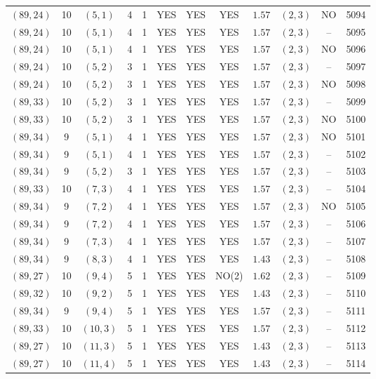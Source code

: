 \begin{longtable}{|c|c|c|c|c|c|c|c|c|c|c|c|}
$(89,24)$ & 10 & $(5,1)$ & 4 & 1 & YES & YES & YES & $1.57$ & $(2,3)$ & NO & 5094\\
$(89,24)$ & 10 & $(5,1)$ & 4 & 1 & YES & YES & YES & $1.57$ & $(2,3)$ & -- & 5095\\
$(89,24)$ & 10 & $(5,1)$ & 4 & 1 & YES & YES & YES & $1.57$ & $(2,3)$ & NO & 5096\\
$(89,24)$ & 10 & $(5,2)$ & 3 & 1 & YES & YES & YES & $1.57$ & $(2,3)$ & -- & 5097\\
$(89,24)$ & 10 & $(5,2)$ & 3 & 1 & YES & YES & YES & $1.57$ & $(2,3)$ & NO & 5098\\
$(89,33)$ & 10 & $(5,2)$ & 3 & 1 & YES & YES & YES & $1.57$ & $(2,3)$ & -- & 5099\\
$(89,33)$ & 10 & $(5,2)$ & 3 & 1 & YES & YES & YES & $1.57$ & $(2,3)$ & NO & 5100\\
$(89,34)$ & 9 & $(5,1)$ & 4 & 1 & YES & YES & YES & $1.57$ & $(2,3)$ & NO & 5101\\
$(89,34)$ & 9 & $(5,1)$ & 4 & 1 & YES & YES & YES & $1.57$ & $(2,3)$ & -- & 5102\\
$(89,34)$ & 9 & $(5,2)$ & 3 & 1 & YES & YES & YES & $1.57$ & $(2,3)$ & -- & 5103\\
$(89,33)$ & 10 & $(7,3)$ & 4 & 1 & YES & YES & YES & $1.57$ & $(2,3)$ & -- & 5104\\
$(89,34)$ & 9 & $(7,2)$ & 4 & 1 & YES & YES & YES & $1.57$ & $(2,3)$ & NO & 5105\\
$(89,34)$ & 9 & $(7,2)$ & 4 & 1 & YES & YES & YES & $1.57$ & $(2,3)$ & -- & 5106\\
$(89,34)$ & 9 & $(7,3)$ & 4 & 1 & YES & YES & YES & $1.57$ & $(2,3)$ & -- & 5107\\
$(89,34)$ & 9 & $(8,3)$ & 4 & 1 & YES & YES & YES & $1.43$ & $(2,3)$ & -- & 5108\\
$(89,27)$ & 10 & $(9,4)$ & 5 & 1 & YES & YES & NO(2) & $1.62$ & $(2,3)$ & -- & 5109\\
$(89,32)$ & 10 & $(9,2)$ & 5 & 1 & YES & YES & YES & $1.43$ & $(2,3)$ & -- & 5110\\
$(89,34)$ & 9 & $(9,4)$ & 5 & 1 & YES & YES & YES & $1.57$ & $(2,3)$ & -- & 5111\\
$(89,33)$ & 10 & $(10,3)$ & 5 & 1 & YES & YES & YES & $1.57$ & $(2,3)$ & -- & 5112\\
$(89,27)$ & 10 & $(11,3)$ & 5 & 1 & YES & YES & YES & $1.43$ & $(2,3)$ & -- & 5113\\
$(89,27)$ & 10 & $(11,4)$ & 5 & 1 & YES & YES & YES & $1.43$ & $(2,3)$ & -- & 5114\\

\end{longtable}
